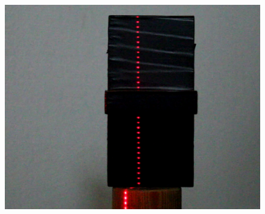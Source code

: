 \begin{figure}[ht!]
\begin{minipage}[t]{0.3\textwidth}
	\end{minipage}
	\hspace{0.02\textwidth}
	\begin{minipage}[t]{0.3\textwidth}
		\centering	
		\includegraphics[width=1\textwidth]{figures/ImageAnalysis/Crop/cross1_occlusion.png}
	\end{minipage}
	
	\vspace{0.02\textheight}
	

\end{figure}
